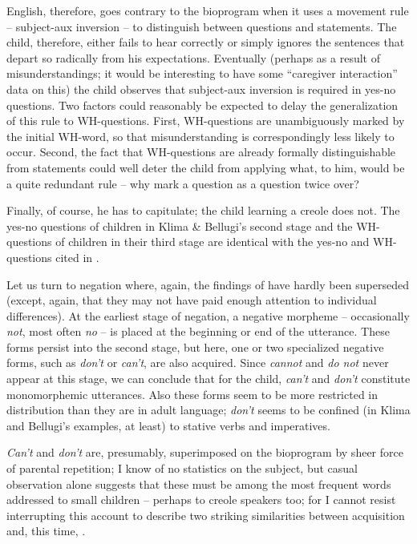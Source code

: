 English, therefore, goes contrary to the bioprogram when it uses a movement rule -- subject-aux inversion -- to distinguish between questions and statements. The child, therefore, either fails to hear correctly or simply ignores the sentences that depart so radically from his expectations. Eventually (perhaps as a result of misunderstandings; it would be interesting to have some ``caregiver interaction'' data on this) the child observes that subject-aux inversion is required in yes-no questions. Two factors could reasonably be expected to delay the generalization of this rule to WH-questions. First, WH-questions are unambiguously marked by the initial WH-word, so that misunderstanding is correspondingly less likely to occur. Second, the fact that WH-questions are already formally distinguishable from statements could well deter the child from applying what, to him, would be a quite redundant rule -- why mark a question as a question twice over?

Finally, of course, he has to capitulate; the child learning a creole does not. The yes-no questions of children in Klima \& Bellugi's
second stage and the WH-questions of children in their third stage are identical with the yes-no and WH-questions cited in .

Let us turn to negation where, again, the findings of \citet{KlimaEtAl1966} have hardly been superseded (except, again, that they may not have paid enough attention to individual differences). At the earliest stage of negation, a negative morpheme -- occasionally \textit{not}, most often \textit{no} -- is placed at the beginning or end of the utterance. These forms persist into the second stage, but here, one or two specialized negative forms, such as \textit{don't} or \textit{can't}, are also acquired. Since \textit{cannot} and \textit{do not} never appear at this stage, we can conclude that for the child, \textit{can't} and \textit{don't} constitute monomorphemic utterances. Also these forms seem to be more restricted in distribution than they are in adult language; \textit{don't} seems to be confined (in Klima and Bellugi's examples, at least) to stative verbs and imperatives.

\textit{Can't} and \textit{don't} are, presumably, superimposed on the bioprogram by sheer force of parental repetition; I know of no statistics on the subject, but casual observation alone suggests that these must be among the most frequent words addressed to small children -- perhaps to creole speakers too; for I cannot resist interrupting this account to describe two striking similarities between acquisition and, this time, .\\\\


